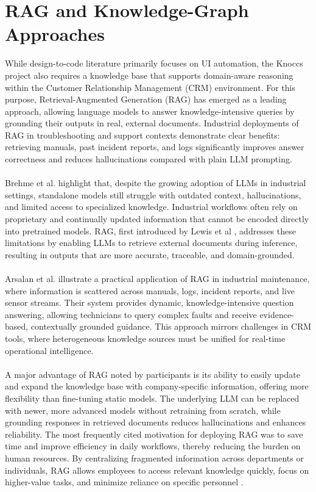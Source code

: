 \section{RAG and Knowledge-Graph Approaches}
While design-to-code literature primarily focuses on UI automation, the Knoccs project also requires a knowledge base that supports domain-aware reasoning within the Customer Relationship Management (CRM) environment. For this purpose, Retrieval-Augmented Generation (RAG) has emerged as a leading approach, allowing language models to answer knowledge-intensive queries by grounding their outputs in real, external documents. Industrial deployments of RAG in troubleshooting and support contexts demonstrate clear benefits: retrieving manuals, past incident reports, and logs significantly improves answer correctness and reduces hallucinations compared with plain LLM prompting.
\\\\
Brehme et al. \cite{Brehme} highlight that, despite the growing adoption of LLMs in industrial settings, standalone models still struggle with outdated context, hallucinations, and limited access to specialized knowledge. Industrial workflows often rely on proprietary and continually updated information that cannot be encoded directly into pretrained models. RAG, first introduced by Lewis et al \cite{Lewis}, addresses these limitations by enabling LLMs to retrieve external documents during inference, resulting in outputs that are more accurate, traceable, and domain-grounded.
\\\\
Arsalan et al. \cite{arslan2024surveyRAG} illustrate a practical application of RAG in industrial maintenance, where information is scattered across manuals, logs, incident reports, and live sensor streams. Their system provides dynamic, knowledge-intensive question answering, allowing technicians to query complex faults and receive evidence-based, contextually grounded guidance. This approach mirrors challenges in CRM tools, where heterogeneous knowledge sources must be unified for real-time operational intelligence.
\\\\
A major advantage of RAG noted by participants is its ability to easily update and expand the knowledge base with company-specific information, offering more flexibility than fine-tuning static models. The underlying LLM can be replaced with newer, more advanced models without retraining from scratch, while grounding responses in retrieved documents reduces hallucinations and enhances reliability. The most frequently cited motivation for deploying RAG was to save time and improve efficiency in daily workflows, thereby reducing the burden on human resources. By centralizing fragmented information across departments or individuals, RAG allows employees to access relevant knowledge quickly, focus on higher-value tasks, and minimize reliance on specific personnel \cite{Brehme}.
